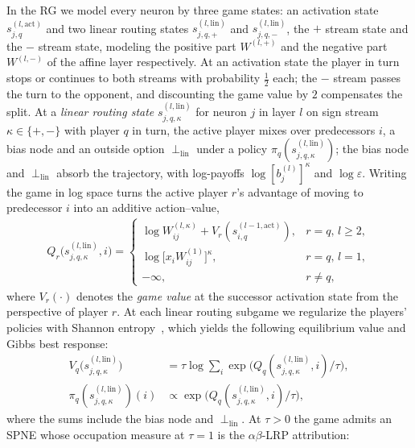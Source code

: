 \documentclass[twoside]{article}
\newif\ifch \chfalse
\newcommand{\ch}[1]{\ifch\textcolor{magenta}{#1}\else#1\fi}
\newcommand{\1}{\mathbf{1}}
\begin{document}
In the \ac{RG} we model every neuron by three game states: an activation state
$s^{(l,\mathrm{act})}_{j,q}$ and two linear routing states $s^{(l,\mathrm{lin})}_{j,q,+}$ and
$s^{(l,\mathrm{lin})}_{j,q,-}$, the $+$ stream state and the $-$ stream state, modeling the
positive part $W^{(l,+)}$ and the negative part $W^{(l,-)}$ of the affine layer respectively. At an
activation state the player in turn stops or continues to both streams with probability $\tfrac12$
each; the $-$ stream passes the turn to the opponent, \ch{and discounting the game value by $2$}
compensates the split.
At a \emph{linear routing state} $s^{(l,\mathrm{lin})}_{j,q,\kappa}$ for neuron $j$ in layer $l$ on
sign stream $\kappa \in \{+,-\}$ with player $q$ in turn, the active player mixes over predecessors
$i$, a bias node and an outside option $\perp_{\mathrm{lin}}$ under a policy
$\pi_{q}(s_{j,q,\kappa}^{(l,\text{lin})})$; the bias node and $\perp_{\mathrm{lin}}$ absorb the
trajectory, with log-payoffs $\log[b^{(l)}_j]^\kappa$ and $\log\varepsilon$.
Writing the game in log space turns the active player $r$'s advantage of moving to predecessor $i$
into an additive action--value,
\begin{align}\label{eq:q-value}
    Q_r\bigl(s^{(l,\mathrm{lin})}_{j,q,\kappa}, i\bigr) = \begin{cases} \log W_{ij}^{(l,\kappa)} {+} V_r(s^{(l-1,\mathrm{act})}_{i,q}), & r{=}q,\, l{\ge}2,\\[0.2em] \log \bigl[x_i W_{ij}^{(1)}\bigr]^{\kappa}, & r{=}q,\, l{=}1, \\
        -\infty, & r \neq q,
    \end{cases}
\end{align}
where $V_r(\cdot)$ denotes the \emph{game value} at the successor activation state from the
perspective of player $r$. At each linear routing subgame we regularize the players' policies with
Shannon entropy~\citep{Geist2019regularized}, which yields the following equilibrium value and
Gibbs best response:
\begin{align}
    V_q\!\bigl(s^{(l,\mathrm{lin})}_{j,q,\kappa}\bigr) &= \tau \log \textstyle\sum_i
    \exp\!\bigl(Q_q(s^{(l,\mathrm{lin})}_{j,q,\kappa}, i)/\tau\bigr), \label{eq:soft-bellman}\\
    \pi_{q}(s_{j,q,\kappa}^{(l,\text{lin})})(i) &\propto
    \exp\!\bigl(Q_q(s^{(l,\mathrm{lin})}_{j,q,\kappa}, i)/\tau\bigr), \label{eq:gibbs-policy}
\end{align}
where the sums include the bias node and $\perp_{\mathrm{lin}}$. At $\tau>0$ the game admits an
SPNE whose occupation measure at $\tau=1$ is the $\alpha\beta$-\ac{LRP} attribution:
\end{document}
